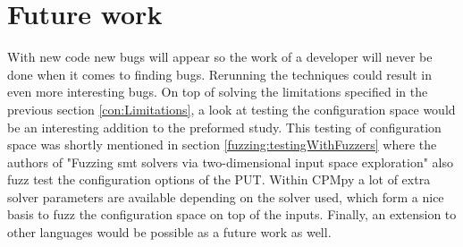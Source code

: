 


\section{Future work}
\label{con:FutureWork}
With new code new bugs will appear so the work of a developer will never be done when it comes to finding bugs. Rerunning the techniques could result in even more interesting bugs. 
On top of solving the limitations specified in the previous section \ref{con:Limitations},
a look at testing the configuration space would be an interesting addition to the preformed study. This testing of configuration space was shortly mentioned in section \ref{fuzzing:testingWithFuzzers} where the authors of "Fuzzing smt solvers via two-dimensional input space exploration" \cite{42FalconFuzzingConfigurationSettingsAndNormal} also fuzz test the configuration options of the PUT. Within CPMpy a lot of extra solver parameters are available depending on the solver used, which form a nice basis to fuzz the configuration space on top of the inputs.
Finally, an extension to other languages would be possible as a future work as well.


